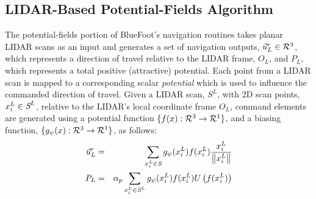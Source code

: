 		\subsection{LIDAR-Based Potential-Fields Algorithm}

			The potential-fields portion of BlueFoot's navigation routines takes planar LIDAR scans as an input and generates a set of navigation outputs, $\vec{u}^{r}_{L} \in {\cal R}^{3}$, which represents a direction of travel relative to the LIDAR frame, $O_{L}$, and $P_{L}$, which represents a total positive (attractive) potential. Each point from a LIDAR scan is mapped to a corresponding scalar \emph{potential} which is used to influence the commanded direction of travel. Given a LIDAR scan, $S^{L}$, with 2D scan points, $x_{i}^{L}\in\emph{S}^{L}$, relative to the LIDAR's local coordinate frame $O_{L}$, command elements are generated using a potential function $\{ f(x) : {\cal R}^{3}\rightarrow {\cal R}^{1} \}$, and a biasing function, $\{ g_{\psi}(x) : {\cal R}^{3}\rightarrow {\cal R}^{1} \}$, as follows:
				\begin{eqnarray}
					\vec{u}^{r}_{L} &=&  { \sum_{x_{i}^{L} \in \emph{S}} g_{\psi}(x_{i}^{L})  f( x_{i}^{L} ) \frac{x_{i}^{L}}{\left\lVert x_{i}^{L}\right\rVert} } \nonumber \\
					P_{L} & = & \alpha_{p}\sum_{x_{i}^{L} \in \emph{S}^{L}} g_{\psi}(x_{i}^{L})  f( x_{i}^{L} ) U\left(f( x_{i}^{L} )\right)
					\label{eq::full_potential_fields}
				\end{eqnarray}

